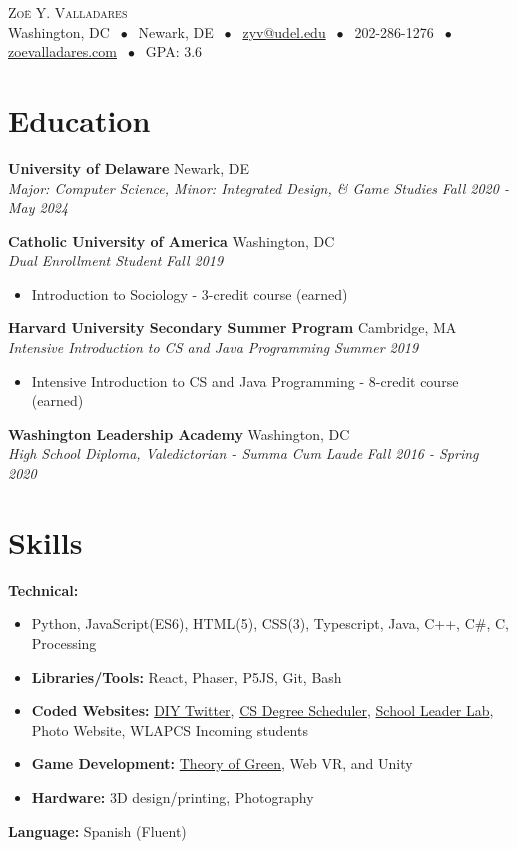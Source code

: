 \documentclass[letterpaper,10.5pt]{article}
\newcommand{\entry}[4]{%
  \vspace{2pt}
  \noindent\textbf{#1} \hfill #2 \\
  \noindent\textit{#3} \hfill \textit{#4}\par
  \vspace{-2pt}
}
\begin{document}
\begin{center}
  {\Huge \scshape Zoë Y. Valladares} \\[4pt]
  Washington, DC $\;\bullet\;$ Newark, DE $\;\bullet\;$
  \href{mailto:zyv@udel.edu}{zyv@udel.edu} $\;\bullet\;$ 
  202-286-1276 $\;\bullet\;$ \href{https://zoevalladares.com}{zoevalladares.com} $\;\bullet\;$ GPA: 3.6
\end{center}

\section{Education}

\entry{University of Delaware}{Newark, DE}
      {Major: Computer Science, Minor: Integrated Design, \& Game Studies}{Fall 2020 - May 2024}
\entry{Catholic University of America}{Washington, DC}
      {Dual Enrollment Student}{Fall 2019}
      \begin{itemize}
        \item Introduction to Sociology - 3-credit course (earned)
      \end{itemize}
\entry{Harvard University Secondary Summer Program}{Cambridge, MA}
      {Intensive Introduction to CS and Java Programming}{Summer 2019}
      \begin{itemize}
        \item Intensive Introduction to CS and Java Programming - 8-credit course (earned)
      \end{itemize}
\entry{Washington Leadership Academy}{Washington, DC}
      {High School Diploma, Valedictorian - Summa Cum Laude}{Fall 2016 - Spring 2020}

\section{Skills}

\textbf{Technical:} 
\begin{itemize}
  \item[] Python, JavaScript(ES6), HTML(5), CSS(3), Typescript, Java, C++, C\#, C, Processing
  \item[] \textbf{Libraries/Tools:} React, Phaser, P5JS, Git, Bash
  \item[] \textbf{Coded Websites:} \href{https://cisc472-bawker.web.app/}{DIY Twitter}, \href{https://ud-cisc275-s22.github.io/cis-scheduler-team-17/}{CS Degree Scheduler}, \href{https://www.schoolleaderlab.org/}{School Leader Lab}, Photo Website, WLAPCS Incoming students
  \item[] \textbf{Game Development:} \href{https://github.com/Pink-Hat-Hacker/mvp-theoryofgreen-backup}{Theory of Green}, Web VR, and Unity
  \item[] \textbf{Hardware:} 3D design/printing, Photography
\end{itemize}
\textbf{Language:} Spanish (Fluent)
\end{document}
